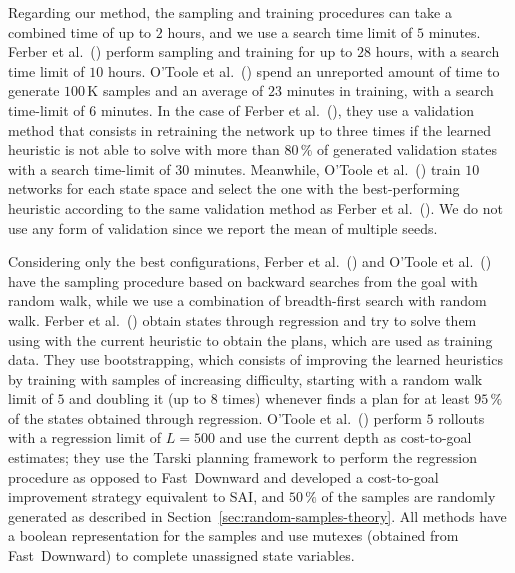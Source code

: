 Regarding our method, the sampling and training procedures can take a combined time of up to $2$ hours, and we use a search time limit of $5$ minutes. Ferber et al.~(\citeyear{Ferber.etal/2022}) perform sampling and training for up to $28$ hours, with a search time limit of $10$ hours. O'Toole et al.~(\citeyear{OToole/2022}) spend an unreported amount of time to generate $100$\,K samples and an average of $23$ minutes in training, with a search time-limit of $6$ minutes. In the case of Ferber et al.~(\citeyear{Ferber.etal/2022}), they use a validation method that consists in retraining the network up to three times if the learned heuristic is not able to solve with \gbfs more than $80\,\%$ of generated validation states with a search time-limit of $30$ minutes. Meanwhile, O'Toole et al.~(\citeyear{OToole/2022}) train $10$ networks for each state space and select the one with the best-performing heuristic according to the same validation method as Ferber et al.~(\citeyear{Ferber.etal/2022}). We do not use any form of validation since we report the mean of multiple seeds.

Considering only the best configurations, Ferber et al.~(\citeyear{Ferber.etal/2022}) and O'Toole et al.~(\citeyear{OToole/2022}) have the sampling procedure based on backward searches from the goal with random walk, while we use a combination of breadth-first search with random walk. Ferber et al.~(\citeyear{Ferber.etal/2022}) obtain states through regression and try to solve them using \gbfs with the current heuristic to obtain the plans, which are used as training data. They use bootstrapping, which consists of improving the learned heuristics by training with samples of increasing difficulty, starting with a random walk limit of $5$ and doubling it (up to $8$ times) whenever \gbfs finds a plan for at least $95\,\%$ of the states obtained through regression. O'Toole et al.~(\citeyear{OToole/2022}) perform $5$ rollouts with a regression limit of $L=500$ and use the current depth as cost-to-goal estimates; they use the Tarski planning framework to perform the regression procedure as opposed to Fast~Downward and developed a cost-to-goal improvement strategy equivalent to SAI, and $50\,\%$ of the samples are randomly generated as described in Section~\ref{sec:random-samples-theory}. All methods have a boolean representation for the samples and use mutexes (obtained from Fast~Downward) to complete unassigned state variables.

